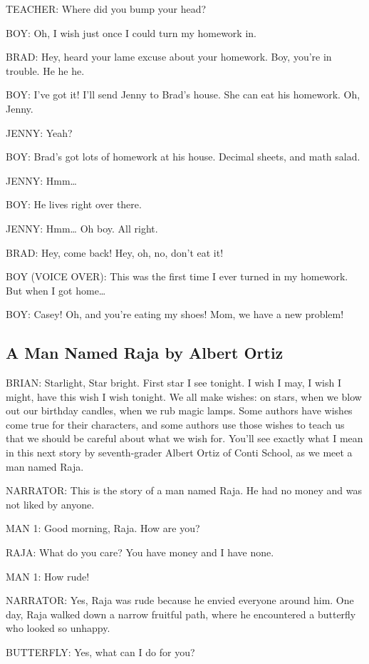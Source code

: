 TEACHER:
Where did you bump your head?

BOY:
Oh, I wish just once I could turn my homework in.

BRAD:
Hey, heard your lame excuse about your homework.
Boy, you're in trouble.
He he he.

BOY:
I've got it!
I'll send Jenny to Brad's house.
She can eat his homework.
Oh, Jenny.

JENNY:
Yeah?

BOY:
Brad's got lots of homework at his house.
Decimal sheets, and math salad.

JENNY:
Hmm\dots

BOY:
He lives right over there.

JENNY:
Hmm\dots
Oh boy.
All right.

BRAD:
Hey, come back!
Hey, oh, no, don't eat it!

BOY (VOICE OVER):
This was the first time I ever turned in my homework.
But when I got home\dots

BOY:
Casey!
Oh, and you're eating my shoes!
Mom, we have a new problem!

\subsection{A Man Named Raja by Albert Ortiz}

BRIAN:
Starlight, Star bright.
First star I see tonight.
I wish I may, I wish I might, have this wish I wish tonight.
We all make wishes: on stars, when we blow out our birthday candles, when we rub magic lamps.
Some authors have wishes come true for their characters, and some authors use those wishes to teach us that we should be careful about what we wish for.
You'll see exactly what I mean in this next story by seventh-grader Albert Ortiz of Conti School, as we meet a man named Raja.

NARRATOR:
This is the story of a man named Raja.
He had no money and was not liked by anyone.

MAN 1:
Good morning, Raja.
How are you?

RAJA:
What do you care?
You have money and I have none.

MAN 1:
How rude!

NARRATOR:
Yes, Raja was rude because he envied everyone around him.
One day, Raja walked down a narrow fruitful path, where he encountered a butterfly who looked so unhappy.

BUTTERFLY:
Yes, what can I do for you?

